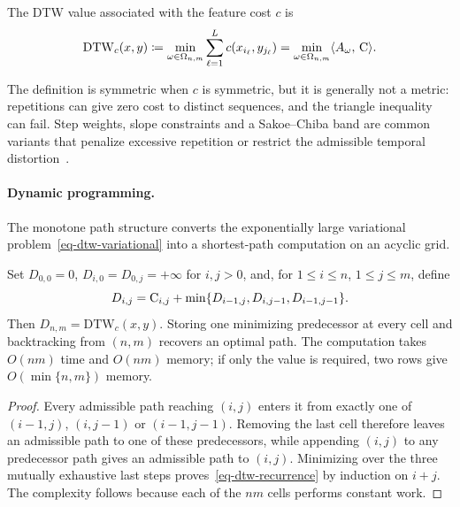 \begin{defn}\label{def-dynamic-time-warping}
	The DTW value associated with the feature cost $c$ is
	\begin{equation}\label{eq-dtw-variational}
		\mathrm{DTW}_c(x,y)
		\coloneqq
		\min_{\omega\in\Omega_{n,m}}
		\sum_{\ell=1}^L c(x_{i_\ell},y_{j_\ell})
		=
		\min_{\omega\in\Omega_{n,m}}\langle A_\omega,\,\mathrm{C}\rangle.
	\end{equation}
\end{defn}
The definition is symmetric when $c$ is symmetric, but it is generally not a metric: repetitions can give zero cost to distinct sequences, and the triangle inequality can fail. Step weights, slope constraints and a Sakoe--Chiba band are common variants that penalize excessive repetition or restrict the admissible temporal distortion~\cite{SakoeChiba1978DTW,Muller2007MusicMotion}.

\paragraph{Dynamic programming.}
The monotone path structure converts the exponentially large variational problem~\eqref{eq-dtw-variational} into a shortest-path computation on an acyclic grid.

\begin{prop}\label{prop-dtw-dynamic-programming}
	Set $D_{0,0}=0$, $D_{i,0}=D_{0,j}=+\infty$ for $i,j>0$, and, for $1\leq i\leq n$, $1\leq j\leq m$, define
	\begin{equation}\label{eq-dtw-recurrence}
		D_{i,j}
		=
		\mathrm{C}_{i,j}+\min\{D_{i-1,j},D_{i,j-1},D_{i-1,j-1}\}.
	\end{equation}
	Then $D_{n,m}=\mathrm{DTW}_c(x,y)$. Storing one minimizing predecessor at every cell and backtracking from $(n,m)$ recovers an optimal path. The computation takes $O(nm)$ time and $O(nm)$ memory; if only the value is required, two rows give $O(\min\{n,m\})$ memory.
\end{prop}

\begin{proof}
	Every admissible path reaching $(i,j)$ enters it from exactly one of $(i-1,j)$, $(i,j-1)$ or $(i-1,j-1)$. Removing the last cell therefore leaves an admissible path to one of these predecessors, while appending $(i,j)$ to any predecessor path gives an admissible path to $(i,j)$. Minimizing over the three mutually exhaustive last steps proves~\eqref{eq-dtw-recurrence} by induction on $i+j$. The complexity follows because each of the $nm$ cells performs constant work.
\end{proof}

